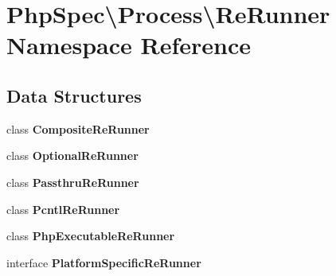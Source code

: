 \section{Php\+Spec\textbackslash{}Process\textbackslash{}Re\+Runner Namespace Reference}
\label{namespace_php_spec_1_1_process_1_1_re_runner}
\subsection*{Data Structures}
\begin{DoxyCompactItemize}
\item 
class {\bf Composite\+Re\+Runner}
\item 
class {\bf Optional\+Re\+Runner}
\item 
class {\bf Passthru\+Re\+Runner}
\item 
class {\bf Pcntl\+Re\+Runner}
\item 
class {\bf Php\+Executable\+Re\+Runner}
\item 
interface {\bf Platform\+Specific\+Re\+Runner}
\end{DoxyCompactItemize}

